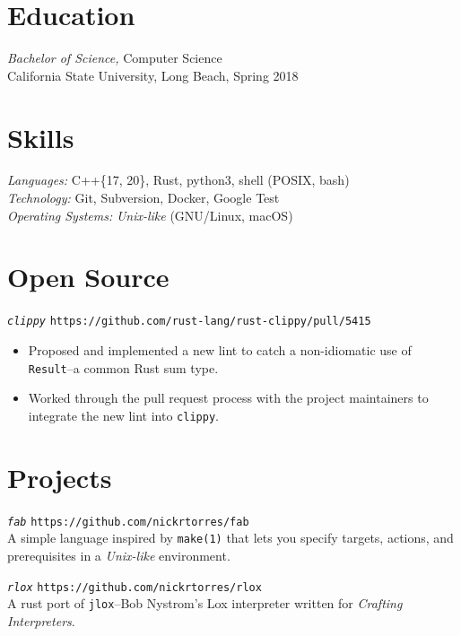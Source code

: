 \documentclass[margin]{res}
\begin{document}
\begin{resume}
\section{Education}
                    {\sl Bachelor of Science,} Computer Science \\
                    California State University, Long Beach, Spring 2018

\section{Skills}
                    {\sl Languages:} C++\{17, 20\}, Rust, python3, shell (POSIX, bash) \\
                    {\sl Technology:} Git, Subversion, Docker, Google Test  \\
                    {\sl Operating Systems:} \textit{Unix-like} (GNU/Linux, macOS) \\

\section{Open Source}
              {\sl \texttt{clippy}} \hfill \texttt{https://github.com/rust-lang/rust-clippy/pull/5415}
                 \begin{itemize}
                   \item Proposed and implemented a new lint to catch a non-idiomatic use of
                   \texttt{Result}--a common Rust sum type.
                   \item Worked through the pull request process with the
                   project maintainers to integrate the new lint into
                   \texttt{clippy}.
                 \end{itemize}

\section{Projects}
             {\sl \texttt{fab}} \hfill \texttt{https://github.com/nickrtorres/fab} \\
             A simple language inspired by \texttt{make(1)} that lets you
             specify targets, actions, and prerequisites in a
             \textit{Unix-like} environment.

             {\sl \texttt{rlox}} \hfill \texttt{https://github.com/nickrtorres/rlox} \\
             A rust port of \texttt{jlox}--Bob Nystrom's Lox interpreter
             written for {\sl Crafting Interpreters}.

\end{resume}
\end{document}
